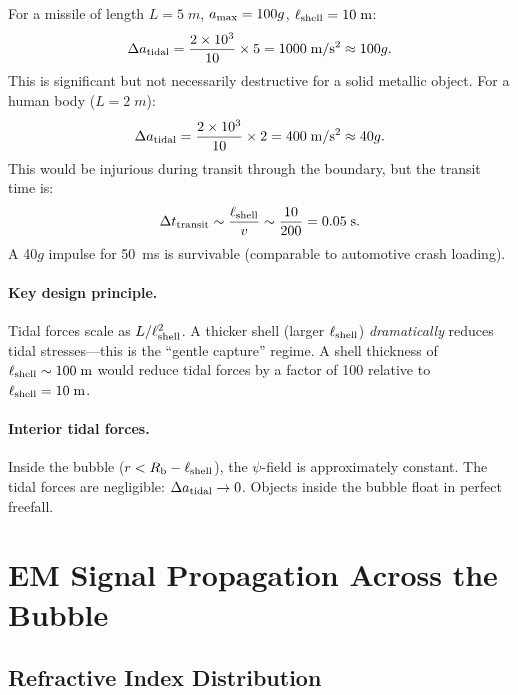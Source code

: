 \documentclass[12pt,aps,prd,superscriptaddress,nofootinbib]{revtex4-2}
\newcommand{\Rb}{R_{\rm b}}
\newcommand{\Lshell}{\ell_{\rm shell}}
\begin{document}
For a missile of length $L = 5\;\si{m}$, $a_{\rm max} = 100g$,
$\Lshell = 10\;\si{m}$:
\begin{equation}
\Delta a_{\rm tidal} = \frac{2 \times 10^3}{10}\times 5
= 1000\;\si{m/s^2} \approx 100g.
\end{equation}
This is significant but not necessarily destructive for a solid
metallic object. For a human body ($L = 2\;\si{m}$):
\begin{equation}
\Delta a_{\rm tidal} = \frac{2\times 10^3}{10}\times 2
= 400\;\si{m/s^2} \approx 40g.
\end{equation}
This would be injurious during transit through the boundary, but
the transit time is:
\begin{equation}
\Delta t_{\rm transit} \sim \frac{\Lshell}{v}
\sim \frac{10}{200} = 0.05\;\si{s}.
\end{equation}
A 40$g$ impulse for 50~ms is survivable (comparable to automotive
crash loading).

\paragraph{Key design principle.}
Tidal forces scale as $L/\Lshell^2$. A thicker shell (larger
$\Lshell$) \emph{dramatically} reduces tidal stresses---this is
the ``gentle capture'' regime. A shell thickness of
$\Lshell \sim 100\;\si{m}$ would reduce tidal forces by a factor
of 100 relative to $\Lshell = 10\;\si{m}$.

\paragraph{Interior tidal forces.}
Inside the bubble ($r < \Rb - \Lshell$), the $\psi$-field is
approximately constant. The tidal forces are negligible:
$\Delta a_{\rm tidal} \to 0$. Objects inside the bubble float in
perfect freefall.


\section{EM Signal Propagation Across the Bubble}\label{sec:em}

\subsection{Refractive Index Distribution}
\end{document}

